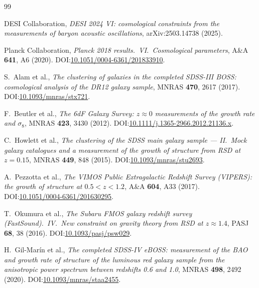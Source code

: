 \documentclass[11pt,a4paper]{article}
\begin{document}
\begin{thebibliography}{99}

\small

 DESI Collaboration, \emph{DESI 2024 VI: cosmological constraints from the measurements of baryon acoustic oscillations}, arXiv:2503.14738 (2025).

 Planck Collaboration, \emph{Planck 2018 results.\ VI.\ Cosmological parameters}, A\&A \textbf{641}, A6 (2020). DOI:\href{https://doi.org/10.1051/0004-6361/201833910}{10.1051/0004-6361/201833910}.

 S.\ Alam et al., \emph{The clustering of galaxies in the completed SDSS-III BOSS: cosmological analysis of the DR12 galaxy sample}, MNRAS \textbf{470}, 2617 (2017). DOI:\href{https://doi.org/10.1093/mnras/stx721}{10.1093/mnras/stx721}.

 F.\ Beutler et al., \emph{The 6dF Galaxy Survey: $z \approx 0$ measurements of the growth rate and $\sigma_8$}, MNRAS \textbf{423}, 3430 (2012). DOI:\href{https://doi.org/10.1111/j.1365-2966.2012.21136.x}{10.1111/j.1365-2966.2012.21136.x}.

 C.\ Howlett et al., \emph{The clustering of the SDSS main galaxy sample --- II.\ Mock galaxy catalogues and a measurement of the growth of structure from RSD at $z = 0.15$}, MNRAS \textbf{449}, 848 (2015). DOI:\href{https://doi.org/10.1093/mnras/stu2693}{10.1093/mnras/stu2693}.

 A.\ Pezzotta et al., \emph{The VIMOS Public Extragalactic Redshift Survey (VIPERS): the growth of structure at $0.5 < z < 1.2$}, A\&A \textbf{604}, A33 (2017). DOI:\href{https://doi.org/10.1051/0004-6361/201630295}{10.1051/0004-6361/201630295}.

 T.\ Okumura et al., \emph{The Subaru FMOS galaxy redshift survey (FastSound).\ IV.\ New constraint on gravity theory from RSD at $z \approx 1.4$}, PASJ \textbf{68}, 38 (2016). DOI:\href{https://doi.org/10.1093/pasj/psw029}{10.1093/pasj/psw029}.

 H.\ Gil-Mar\'in et al., \emph{The completed SDSS-IV eBOSS: measurement of the BAO and growth rate of structure of the luminous red galaxy sample from the anisotropic power spectrum between redshifts 0.6 and 1.0}, MNRAS \textbf{498}, 2492 (2020). DOI:\href{https://doi.org/10.1093/mnras/staa2455}{10.1093/mnras/staa2455}.


\end{thebibliography}
\end{document}

